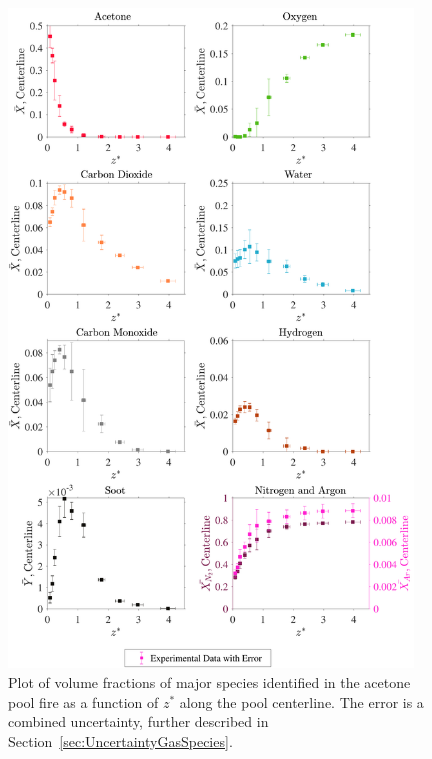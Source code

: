 \documentclass[12pt]{article}
\begin{document}
\begin{figure}[!h]
	\centering
\includegraphics[width=10.75cm,keepaspectratio]{Acetone_MOL_FRAC_Plot.pdf}
	\caption[Volume fractions of major species in the acetone plume]{Plot of volume fractions of major species identified in the acetone pool fire as a function of $z^{*}$ along the pool centerline. The error is a combined uncertainty, further described in Section~\ref{sec:UncertaintyGasSpecies}.}
	\label{fig:Acetone_VOL_Frac_Major}
\end{figure}
\end{document}

